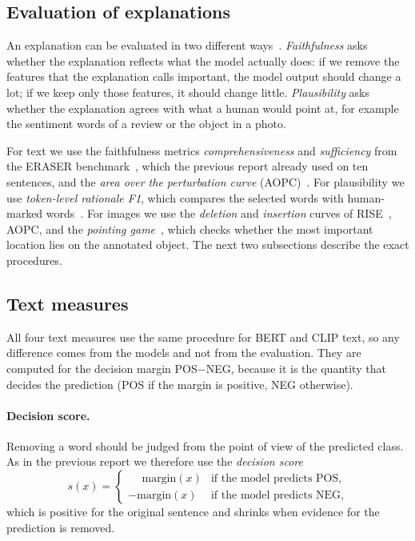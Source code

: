 \documentclass[11pt,a4paper]{article}
\begin{document}
\subsection{Evaluation of explanations}\label{sec:metrics-background}

An explanation can be evaluated in two different ways~\cite{deyoung2020}.
\emph{Faithfulness} asks whether the explanation reflects what the model actually does:
if we remove the features that the explanation calls important, the model output should
change a lot; if we keep only those features, it should change little. \emph{Plausibility}
asks whether the explanation agrees with what a human would point at, for example the
sentiment words of a review or the object in a photo.

For text we use the faithfulness metrics \emph{comprehensiveness} and \emph{sufficiency}
from the ERASER benchmark~\cite{deyoung2020}, which the previous report already used on ten
sentences, and the \emph{area over the perturbation curve} (AOPC)~\cite{samek2017}. For
plausibility we use \emph{token-level rationale F1}, which compares the selected words with
human-marked words~\cite{deyoung2020}. For images we use the \emph{deletion} and
\emph{insertion} curves of RISE~\cite{petsiuk2018}, AOPC, and the \emph{pointing
game}~\cite{zhang2018}, which checks whether the most important location lies on the
annotated object. The next two subsections describe the exact procedures.

\subsection{Text measures}\label{sec:text-metrics}

All four text measures use the same procedure for BERT and CLIP text, so any difference
comes from the models and not from the evaluation. They are computed for the decision
margin POS$-$NEG, because it is the quantity that decides the prediction (POS if the
margin is positive, NEG otherwise).

\paragraph{Decision score.} Removing a word should be judged from the point of view of the
predicted class. As in the previous report we therefore use the \emph{decision score}
\begin{equation}
  s(x) = \begin{cases}
    \phantom{-}\text{margin}(x) & \text{if the model predicts POS,}\\
    -\text{margin}(x) & \text{if the model predicts NEG,}
  \end{cases}
  \label{eq:decision}
\end{equation}
which is positive for the original sentence and shrinks when evidence for the prediction
is removed.
\end{document}
